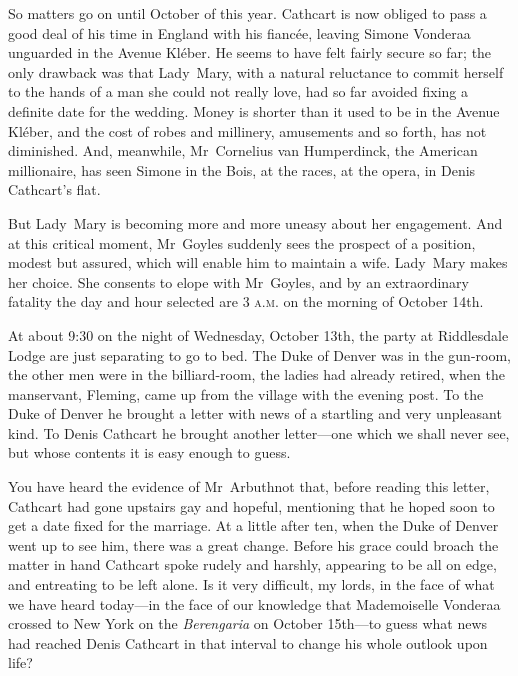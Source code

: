 \begin{dialogue}
\smallskip 

So matters go on until October of this year. Cathcart is now obliged to pass a good deal of his time in England with his fiancée, leaving Simone Vonderaa unguarded in the Avenue Kléber. He seems to have felt fairly secure so far; the only drawback was that Lady~Mary, with a natural reluctance to commit herself to the hands of a man she could not really love, had so far avoided fixing a definite date for the wedding. Money is shorter than it used to be in the Avenue Kléber, and the cost of robes and millinery, amusements and so forth, has not diminished. And, meanwhile, Mr~Cornelius van Humperdinck, the American millionaire, has seen Simone in the Bois, at the races, at the opera, in Denis Cathcart's flat.

\smallskip 

But Lady~Mary is becoming more and more uneasy about her engagement. And at this critical moment, Mr~Goyles suddenly sees the prospect of a position, modest but assured, which will enable him to maintain a wife. Lady~Mary makes her choice. She consents to elope with Mr~Goyles, and by an extraordinary fatality the day and hour selected are 3 \textsc{a.m.} on the morning of October 14th.

\smallskip 

At about 9:30 on the night of Wednesday, October 13th, the party at Riddlesdale Lodge are just separating to go to bed. The Duke of Denver was in the gun-room, the other men were in the billiard-room, the ladies had already retired, when the manservant, Fleming, came up from the village with the evening post. To the Duke of Denver he brought a letter with news of a startling and very unpleasant kind. To Denis Cathcart he brought another letter—one which we shall never see, but whose contents it is easy enough to guess.

\smallskip 

You have heard the evidence of Mr~Arbuthnot that, before reading this letter, Cathcart had gone upstairs gay and hopeful, mentioning that he hoped soon to get a date fixed for the marriage. At a little after ten, when the Duke of Denver went up to see him, there was a great change. Before his grace could broach the matter in hand Cathcart spoke rudely and harshly, appearing to be all on edge, and entreating to be left alone. Is it very difficult, my lords, in the face of what we have heard today—in the face of our knowledge that Mademoiselle Vonderaa crossed to New York on the \textit{Berengaria} on October 15th—to guess what news had reached Denis Cathcart in that interval to change his whole outlook upon life?


\end{dialogue}
